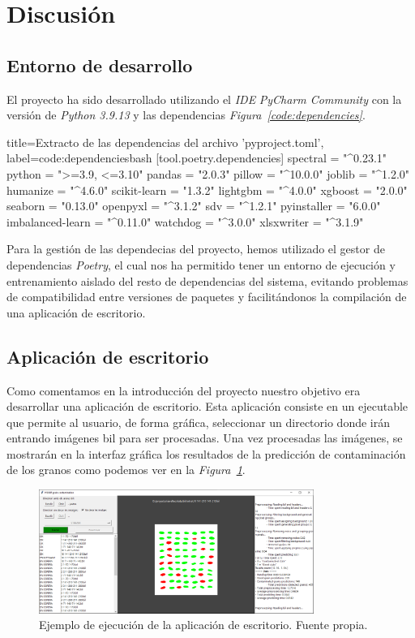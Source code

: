 \section{Discusión}\label{sec:discusion}

\subsection{Entorno de desarrollo}

El proyecto ha sido desarrollado utilizando el \textit{IDE} \textit{PyCharm Community} con la versión de \textit{Python 3.9.13} y las dependencias \textit{Figura\ \ref{code:dependencies}}.

\begin{code}[]{title=Extracto de las dependencias del archivo 'pyproject.toml', label=code:dependencies}{bash}
    [tool.poetry.dependencies]    
    spectral = "^0.23.1"
    python = ">=3.9, <=3.10"
    pandas = "2.0.3"
    pillow = "^10.0.0"
    joblib = "^1.2.0"
    humanize = "^4.6.0"
    scikit-learn = "1.3.2"
    lightgbm = "^4.0.0"
    xgboost = "2.0.0"
    seaborn = "0.13.0"
    openpyxl = "^3.1.2"
    sdv = "^1.2.1"
    pyinstaller = "6.0.0"
    imbalanced-learn = "^0.11.0"
    watchdog = "^3.0.0"
    xlsxwriter = "^3.1.9"
\end{code}

Para la gestión de las dependecias del proyecto, hemos utilizado el gestor de dependencias \textit{Poetry}, el cual nos ha permitido tener un entorno de ejecución y entrenamiento aislado del resto de dependencias del sistema, evitando problemas de compatibilidad entre versiones de paquetes y facilitándonos la compilación de una aplicación de escritorio.

\subsection{Aplicación de escritorio}

Como comentamos en la introducción del proyecto nuestro objetivo era desarrollar una aplicación de escritorio. Esta aplicación consiste en un ejecutable que permite al usuario, de forma gráfica, seleccionar un directorio donde irán entrando imágenes \gls{bil} para ser procesadas. Una vez procesadas las imágenes, se mostrarán en la interfaz gráfica los resultados de la predicción de contaminación de los granos como podemos ver en la \textit{Figura\ \ref{fig:app-example}}. 

\begin{figure}
    \centering
    \includegraphics[width=0.8\textwidth]{media/images/example-execution-xiavaltec.png}
    \caption{Ejemplo de ejecución de la aplicación de escritorio. Fuente propia.}
    \label{fig:app-example}
\end{figure}

